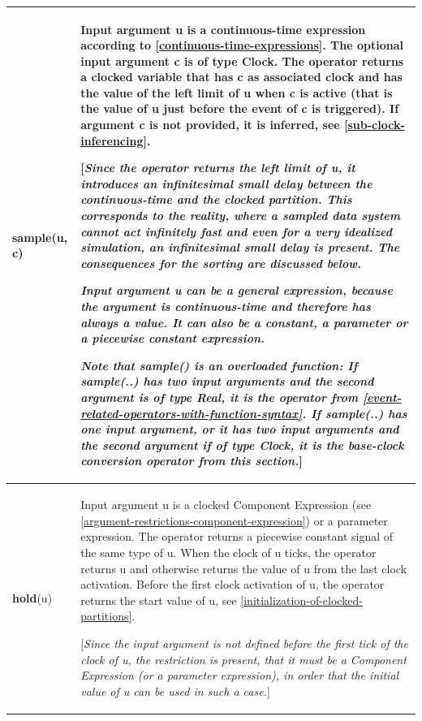 \documentclass[10pt,a4paper]{report}
\begin{document}
\begin{longtable}[]{|l|p{12cm}|}
\hline \endhead
\textbf{sample}(u, c) &
Input argument u is a continuous-time expression according to 
\ref{continuous-time-expressions}. The optional input argument c is of type Clock. The operator
returns a clocked variable that has c as associated clock and has the
value of the left limit of u when c is active (that is the value of u
just before the event of c is triggered). If argument c is not provided,
it is inferred, see \ref{sub-clock-inferencing}.

{[}\emph{Since the operator returns the left limit of u, it introduces
an infinitesimal small delay between the continuous-time and the clocked
partition. This corresponds to the reality, where a sampled data system
cannot act infinitely fast and even for a very idealized simulation, an
infinitesimal small delay is present. The consequences for the sorting
are discussed below.}

\emph{Input argument u can be a general expression, because the argument
is continuous-time and therefore has always a value. It can also be a
constant, a parameter or a piecewise constant expression. }

\emph{Note that \textbf{sample}() is an overloaded function: If
\textbf{sample}(..) has two input arguments and the second argument is
of type Real, it is the operator from \ref{event-related-operators-with-function-syntax}. If
\textbf{sample}(..) has one input argument, or it has two input
arguments and the second argument if of type Clock, it is the base-clock
conversion operator from this section.}{]}\\ \hline
\textbf{hold}(u) &
Input argument u is a clocked Component Expression (see \ref{argument-restrictions-component-expression})
or a parameter expression. The operator returns a piecewise constant
signal of the same type of u. When the clock of u ticks, the operator
returns u and otherwise returns the value of u from the last clock
activation. Before the first clock activation of u, the operator returns
the start value of u, see \ref{initialization-of-clocked-partitions}.

{[}\emph{Since the input argument is not defined before the first tick
of the clock of u, the restriction is present, that it must be a
Component Expression (or a parameter expression), in order that the
initial value of u can be used in such a case.}{]}\\ \hline
\end{longtable}
\end{document}
